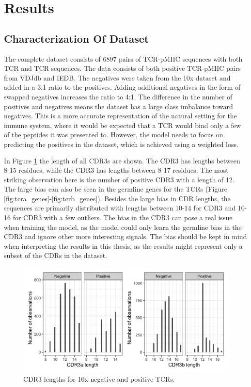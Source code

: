 \section{Results} \label{results}

\subsection{Characterization Of Dataset}
The complete dataset consists of 6897 pairs of TCR-pMHC sequences with both TCR{\textalpha} and TCR{\textbeta} sequences. The data consists of both positive TCR-pMHC pairs from VDJdb and IEDB. The negatives were taken from the 10x dataset and added in a 3:1 ratio to the positives. Adding additional negatives in the form of swapped negatives increases the ratio to 4:1. The difference in the number of positives and negatives means the dataset has a large class imbalance toward negatives. This is a more accurate representation of the natural setting for the immune system, where it would be expected that a TCR would bind only a few of the peptides it was presented to. However, the model needs to focus on predicting the positives in the dataset, which is achieved using a weighted loss.

In Figure \ref{fig:cdr3_length} the length of all CDR3s are shown. The CDR3{\textalpha} has lengths between 8-15 residues, while the CDR3{\textbeta} has lengths between 8-17 residues. The most striking observation here is the number of positive CDR3{\textbeta} with a length of 12. The large bias can also be seen in the germline genes for the TCRs (Figure \ref{fig:tcra_genes}-\ref{fig:tcrb_genes}). Besides the large bias in CDR{\textbeta} lengths, the sequences are primarily distributed with lengths between 10-14 for CDR3{\textalpha} and 10-16 for CDR3{\textbeta} with a few outliers. The bias in the CDR3{\textbeta} can pose a real issue when training the model, as the model could only learn the germline bias in the CDR3{\textbeta} and ignore other more interesting signals. The bias should be kept in mind when interpreting the results in this thesis, as the results might represent only a subset of the CDRs in the dataset.

\begin{figure}[H]
    \centering
    \includegraphics[width = \linewidth]{figures/cdr3_lengths.png}
    \caption{CDR3 lengths for 10x negative and positive TCRs.}
    \label{fig:cdr3_length}
\end{figure}

